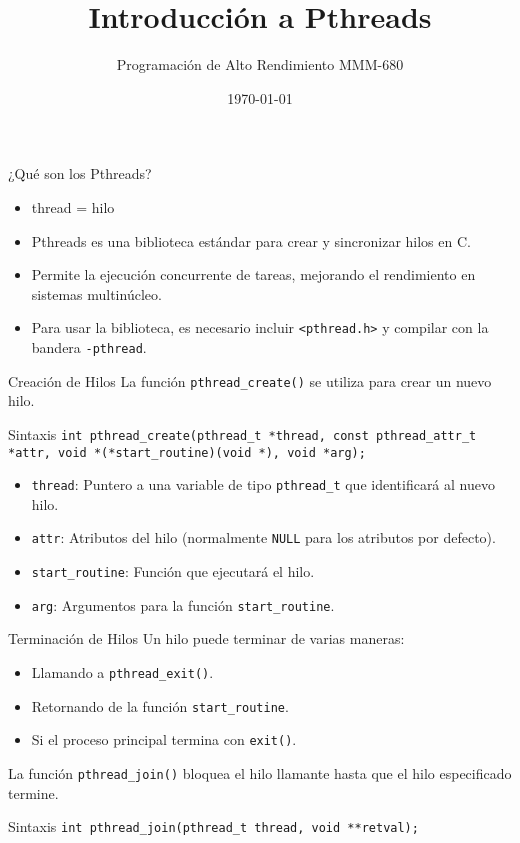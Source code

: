 \documentclass{beamer}
\title{Introducción a Pthreads}
\author{Programación de Alto Rendimiento MMM-680}
\date{\today}
\begin{document}
\begin{frame}
    \titlepage
\end{frame}

\begin{frame}{¿Qué son los Pthreads?}
    \begin{itemize}
        \item thread = hilo
        \item Pthreads es una biblioteca estándar para crear y sincronizar hilos en C.
        \item Permite la ejecución concurrente de tareas, mejorando el rendimiento en sistemas multinúcleo.
        \item Para usar la biblioteca, es necesario incluir \texttt{<pthread.h>} y compilar con la bandera \texttt{-pthread}.
    \end{itemize}
\end{frame}

\begin{frame}{Creación de Hilos}
    La función \texttt{pthread\_create()} se utiliza para crear un nuevo hilo.
    \begin{block}{Sintaxis}
        \texttt{int pthread\_create(pthread\_t *thread, const pthread\_attr\_t *attr, void *(*start\_routine)(void *), void *arg);}
    \end{block}
    \begin{itemize}
        \item \texttt{thread}: Puntero a una variable de tipo \texttt{pthread\_t} que identificará al nuevo hilo.
        \item \texttt{attr}: Atributos del hilo (normalmente \texttt{NULL} para los atributos por defecto).
        \item \texttt{start\_routine}: Función que ejecutará el hilo.
        \item \texttt{arg}: Argumentos para la función \texttt{start\_routine}.
    \end{itemize}
\end{frame}

\begin{frame}{Terminación de Hilos}
    Un hilo puede terminar de varias maneras:
    \begin{itemize}
        \item Llamando a \texttt{pthread\_exit()}.
        \item Retornando de la función \texttt{start\_routine}.
        \item Si el proceso principal termina con \texttt{exit()}.
    \end{itemize}
    \vspace{1cm}
    La función \texttt{pthread\_join()} bloquea el hilo llamante hasta que el hilo especificado termine.
    \begin{block}{Sintaxis}
        \texttt{int pthread\_join(pthread\_t thread, void **retval);}
    \end{block}
\end{frame}
\end{document}
